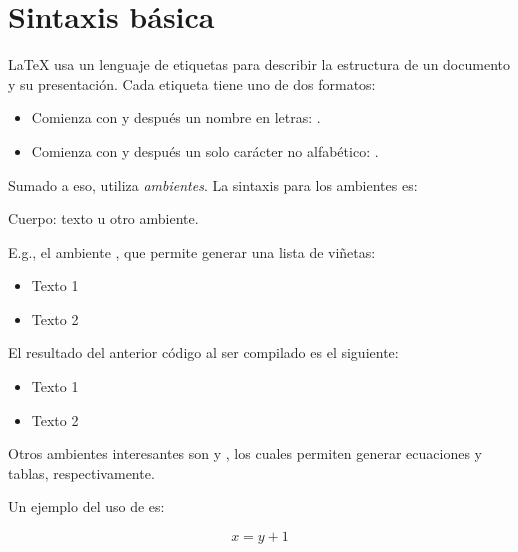 \section{Sintaxis básica}
\LaTeX{} usa un lenguaje de etiquetas para describir la estructura de un documento y su presentación. Cada etiqueta tiene uno de dos formatos:

\begin{itemize}
    \item Comienza con \inline{\textbackslash} y después un nombre en letras: .
    \item Comienza con \inline{\textbackslash} y después un solo carácter no alfabético: \inline{\textbackslash\$}.
\end{itemize}

Sumado a eso, utiliza \emph{ambientes}. La sintaxis para los ambientes es:

\begin{pseudocode}
\relax\begin{nombre de ambiente}
Cuerpo: texto u otro ambiente.
\end{nombre de ambiente}
\end{pseudocode}

E.g., el ambiente , que permite generar una lista de viñetas:

\begin{pseudocode}
\relax\begin{itemize}
    \item Texto 1
    \item Texto 2
\end{itemize}
\end{pseudocode}

El resultado del anterior código al ser compilado es el siguiente:

\begin{itemize}
    \item Texto 1
    \item Texto 2
\end{itemize}

Otros ambientes interesantes son  y , los cuales permiten generar ecuaciones y tablas, respectivamente.

Un ejemplo del uso de  es:

\begin{pseudocode}
\relax\begin{equation}
x=y+1
\end{equation}
\end{pseudocode}


